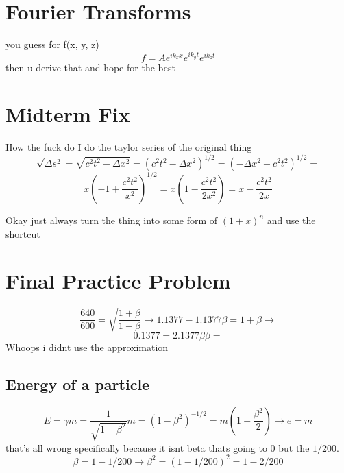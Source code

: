\documentclass{report}
\begin{document}
\section{Fourier Transforms}
you guess for f(x, y, z)
\[
f = Ae^{i k_x x} e^{i k_y t} e^{i k_z t}
\]
then u derive that and hope for the best



\section{Midterm Fix}
How the fuck do I do the taylor series of the original thing
\[
\sqrt{\Delta s^2} = \sqrt{c^2t^2 - \Delta x^2} 
= 
(c^2t^2 - \Delta x^2)^{1/2}
=
( - \Delta x^2 + c^2t^2)^{1/2}
=
\]
\[
x(-1 + \frac{c^2 t^2}{x^2})^{1/2}
=
x(1 -  \frac{c^2 t^2}{2 x^2}) = x -  \frac{c^2 t^2}{2 x }
\]

Okay just always turn the thing into some form of $(1 + x)^n$ and use the shortcut

\section{Final Practice Problem}
\[
\frac{640}{600} = 
\sqrt{\frac{1 + \beta}{1 - \beta}}
\rightarrow
1.1377 -1.1377 \beta = 1 + \beta
\rightarrow
\]
\[
0.1377 = 2.1377 \beta
\beta = 
\]
Whoops i didnt use the approximation

\subsection{Energy of a particle}
\[
E = \gamma m = \frac{1}{\sqrt{1 - \beta^2}} m = (1 - \beta^2)^{-1/2}
=
m(1 + \frac{\beta^2}{2})
\rightarrow 
e
=
m
\]
that's all wrong specifically because it isnt beta thats going to 0 but the $1/200$.
\[
\beta = 1 - 1/200 \rightarrow \beta^2 = (1 - 1/200)^2 = 1 - 2/200 
\]
\end{document}
